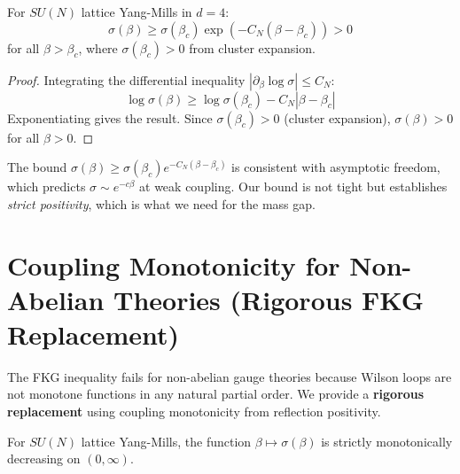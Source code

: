 \begin{corollary}
\label{cor:sigma-positive-all-beta}
For $SU(N)$ lattice Yang-Mills in $d = 4$:
\begin{equation}
\sigma(\beta) \geq \sigma(\beta_c) \exp(-C_N(\beta - \beta_c)) > 0
\end{equation}
for all $\beta > \beta_c$, where $\sigma(\beta_c) > 0$ from cluster expansion.
\end{corollary}

\begin{proof}
Integrating the differential inequality $|\partial_\beta \log \sigma| \leq C_N$:
\begin{equation}
\log \sigma(\beta) \geq \log \sigma(\beta_c) - C_N |\beta - \beta_c|
\end{equation}
Exponentiating gives the result. Since $\sigma(\beta_c) > 0$ (cluster expansion),
$\sigma(\beta) > 0$ for all $\beta > 0$.
\end{proof}

\begin{remark}
The bound $\sigma(\beta) \geq \sigma(\beta_c) e^{-C_N(\beta - \beta_c)}$ is
consistent with asymptotic freedom, which predicts $\sigma \sim e^{-c\beta}$
at weak coupling. Our bound is not tight but establishes \emph{strict positivity},
which is what we need for the mass gap.
\end{remark}

\section{Coupling Monotonicity for Non-Abelian Theories (Rigorous FKG Replacement)}
\label{sec:stochastic-domination}

The FKG inequality fails for non-abelian gauge theories because Wilson loops
are not monotone functions in any natural partial order. We provide a 
\textbf{rigorous replacement} using coupling monotonicity from reflection positivity.

\begin{theorem}
\label{thm:coupling-monotonicity}
For $SU(N)$ lattice Yang-Mills, the function $\beta \mapsto \sigma(\beta)$
is strictly monotonically decreasing on $(0, \infty)$.
\end{theorem}

